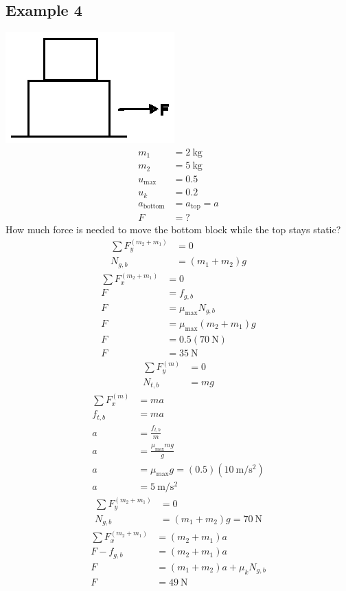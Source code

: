 \documentclass{article}
\begin{document}
\subsection{Example 4}
\includegraphics{"./drawing.eps"}
\begin{align*}
	m_1 & = \SI{2}{\kilogram} \\
	m_2 & = \SI{5}{\kilogram} \\
	u_{\text{max}} & = 0.5 \\
	u_k & = 0.2 \\
	a_\text{bottom}  & = a_\text{top} = a \\
	F & = ?
\end{align*}
How much force is needed to move the bottom block while the top stays static?
\begin{align*}
	\sum F_y^{(m_2 + m_1)} & = 0 \\
	N_{g,b} & = (m_1 + m_2)g
\end{align*}
\begin{align*}
	\sum F_x^{(m_2 + m_1)} & = 0 \\
	F & = f_{g,b} \\
	F & = \mu_\text{max}N_{g,b} \\
	F & = \mu_\text{max}(m_2 + m_1)g \\
	F & = 0.5(\SI{70}{\newton}) \\
	F & = \SI{35}{\newton}
\end{align*}
\begin{align*}
	\sum F_y^{(m)} & = 0 \\
	N_{t,b} & = mg
\end{align*}
\begin{align*}
	\sum F_x^{(m)} & = ma \\
	f_{t,b} & = ma \\
	a & = \frac{f_{t,b}}{m} \\
	a & = \frac{\mu_\text{max}mg}{g} \\
	a & = \mu_\text{max}g = (0.5)(\SI{10}{\meter \per \second \squared}) \\
	a & = \SI{5}{\meter \per \second \squared}
\end{align*}
\begin{align*}
	\sum F_y^{(m_2 + m_1)} & = 0 \\
	N_{g,b} & = (m_1 + m_2)g = \SI{70}{\newton}
\end{align*}
\begin{align*}
	\sum F_x^{(m_2 + m_1)} & = (m_2 + m_1)a \\
	F - f_{g,b} & = (m_2 + m_1)a \\
	F & = (m_1 + m_2)a + \mu_kN_{g,b} \\
	F & = \SI{49}{\newton}
\end{align*}
\end{document}
